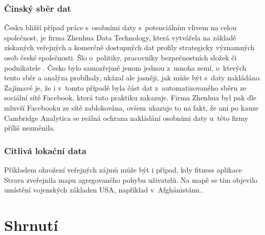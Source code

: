 \subsubsection*{Čínský sběr dat}
Česku bližší případ práce s~osobními daty s~potenciálním vlivem na celou společnost, je firma Zhenhua Data Technology, která vytvářela na základě získaných veřejných a komerčně dostupných dat profily strategicky významných osob české společnosti. Šlo o~politiky, pracovníky bezpečnostních složek či podnikatele \citep{china-czech}. Česko bylo samozřejmě jenom jednou z~mnoha zemí, o~kterých tento sběr a analýza probíhaly, ukázal ale jasněji, jak může být s~daty nakládáno.
Zajímavé je, že i v~tomto případě byla část dat z~automatizovaného sběru ze sociální sítě Facebook, která tuto praktiku zakazuje. Firma Zhenhua byl pak dle mluvší Facebooku ze sítě zablokována, ovšem ukazuje to na fakt, že ani po kauze Cambridge Analytica se reálná ochrana nakládání osobními daty u~této firmy příliš nezměnila.

\subsubsection*{Citlivá lokační data}
Příkladem ohrožení veřejných zájmů může být i případ, kdy fitness aplikace Strava zveřejnila mapu agregovaného pohybu uživatelů. Na mapě se tím objevilo umístění vojenských základen USA, například v~Afghánistánu.\citep{strava-locations}. 

\section{Shrnutí}
